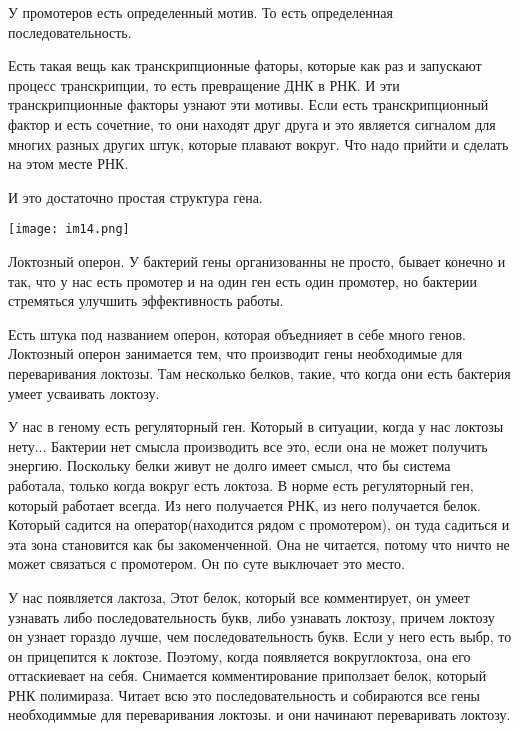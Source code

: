 У промотеров есть определенный мотив. То есть определенная последовательность. 

Есть такая вещь как транскрипционные фаторы, которые как раз и запускают 
процесс транскрипции, то есть превращение ДНК в РНК. И эти транскрипционные 
факторы узнают эти мотивы. Если есть транскрипционный фактор и
есть сочетние, то они находят друг друга и это является сигналом для многих
разных других штук,
которые плавают вокруг. Что надо прийти и сделать на этом месте РНК.

И это достаточно простая структура гена.  

\texttt{[image: im14.png]}

Локтозный оперон. У бактерий гены организованны не просто, 
бывает конечно и так, что у нас есть промотер и на один ген есть
один промотер, но бактерии стремяться улучшить эффективность работы.

Есть штука под названием оперон, которая объеднияет в себе много
генов. Локтозный оперон занимается тем, что производит гены необходимые
для переваривания локтозы. Там несколько белков,
такие, что когда они есть бактерия
умеет усваивать локтозу.

У нас в геному есть регуляторный ген. Который в ситуации, когда у нас
локтозы нету... Бактерии нет смысла производить все это, если
она не может получить энергию. Поскольку белки живут не долго
имеет смысл, что бы система работала, только
когда вокруг есть локтоза. В норме есть регуляторный ген,
который работает всегда. Из него получается
РНК, из него получается белок. Который садится на оператор(находится рядом с промотером),
он туда садиться и эта зона становится как бы закоменченной. Она
не читается, потому что ничто не может связаться с промотером. Он
по суте выключает это место.

У нас появляется лактоза, Этот белок, который все комментирует,
он умеет узнавать либо последовательность букв, либо узнавать локтозу,
причем локтозу он узнает гораздо лучше, чем последовательность букв.
Если у него есть выбр, то он прицепится к локтозе. Поэтому, когда
появляется вокруглоктоза, она его оттаскиевает на себя. Снимается комментирование
приползает белок, который РНК полимираза. Читает всю это последовательность и
собираются все гены необходиммые для переваривания локтозы. и они начинают переваривать локтозу.  
    
